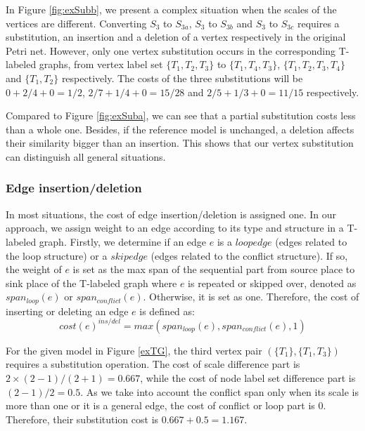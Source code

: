 \documentclass{llncs}
\begin{document}
\begin{example}
In Figure \ref{fig:exSubb}, we present a complex situation when the scales of the vertices are different. Converting $S_{3}$ to $S_{3a}$, $S_{3}$ to $S_{3b}$ and $S_{3}$ to $S_{3c}$ requires a substitution, an insertion and a deletion of a vertex respectively in the original Petri net. However, only one vertex substitution occurs in the corresponding T-labeled graphs, from vertex label set $\{T_{1}, T_{2}, T_{3}\}$ to $\{T_{1}, T_{4}, T_{3}\}$, $\{T_{1}, T_{2}, T_{3}, T_{4}\}$ and $\{T_{1}, T_{2}\}$ respectively. The costs of the three substitutions will be $0+2/4+0 = 1/2$, $2/7+1/4+0 = 15/28$ and $2/5+1/3+0 = 11/15$ respectively. 

Compared to Figure \ref{fig:exSuba}, we can see that a partial substitution costs less than a whole one. Besides, if the reference model is unchanged, a deletion affects their similarity bigger than an insertion. This shows that our vertex substitution can distinguish all general situations.
\end{example}
\subsubsection{Edge insertion/deletion} In most situations, the cost of edge insertion/deletion is assigned one. In our approach, we assign weight to an edge according to its type and structure in a T-labeled graph. Firstly, we determine if an edge $e$ is a $loop edge$ (edges related to the loop structure) or a $skip edge$ (edges related to the conflict structure). If so, the weight of $e$ is set as the max span of the sequential part from source place to sink place of the T-labeled graph where $e$ is repeated or skipped over, denoted as $span_{loop}(e)$ or $span_{conflict}(e)$. Otherwise, it is set as one. Therefore, the cost of inserting or deleting an edge $e$ is defined as:
\begin{equation}\label{eq:edgeInsDel}
cost(e)^{ins/del}=max(span_{loop}(e),span_{conflict}(e),1)
\end{equation}

For the given model in Figure \ref{exTG}, the third vertex pair $(\{T_{1}\},\{T_{1},T_{3}\})$ requires a substitution operation. The cost of scale difference part is $2 \times (2-1)/(2+1) = 0.667$, while the cost of node label set difference part is $(2-1)/2 = 0.5$. As we take into account the conflict span only when its scale is more than one or it is a general edge, the cost of conflict or loop part is 0. Therefore, their substitution cost is $0.667+0.5 = 1.167$.
\end{document}
